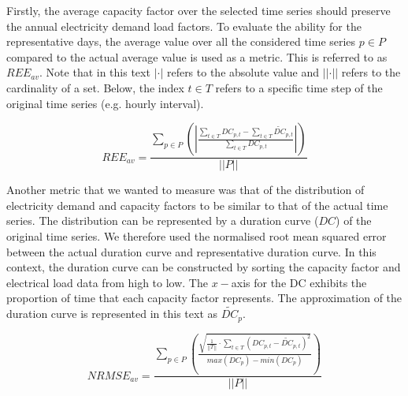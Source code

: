 \documentclass[final,3p,times,twocolumn,numbers]{elsarticle}
\begin{document}
Firstly, the average capacity factor over the selected time series should preserve the annual electricity demand load factors. To evaluate the ability for the representative days, the average value over all the considered time series $p\in P$ compared to the actual average value is used as a metric. This is referred to as $REE_{av}$. Note that in this text $\left|\cdot\right|$ refers to the absolute value and $\left|\left|\cdot\right|\right|$ refers to the cardinality of a set. Below, the index $t\in T$ refers to a specific time step of the original time series (e.g. hourly interval).

\begin{equation}
	REE_{av}=\frac
	{\sum\limits_{p\in P}\left(\left|
	\frac
	{\sum\limits_{t\in T}DC_{p,t}-\sum\limits_{t\in T}\widetilde{DC}_{p,t}}
	{\sum\limits_{t\in T}DC_{p,t}}
	\right|\right)
	}
	{\left|\left|P\right|\right|}
\end{equation}

Another metric that we wanted to measure was that of the distribution of electricity demand and capacity factors to be similar to that of the actual time series. The distribution can be represented by a duration curve ($DC$) of the original time series. We therefore used the normalised root mean squared error between the actual duration curve and representative duration curve. In this context, the duration curve can be constructed by sorting the capacity factor and electrical load data from high to low. The $x-$axis for the DC exhibits the proportion of time that each capacity factor represents. The approximation of the duration curve is represented in this text as $\widetilde{DC}_p$.



\begin{equation}
	NRMSE_{av}=\frac
	{\sum\limits_{p\in P}\left(\frac
	{\sqrt{
	\frac{1}{\left|\left|T\right|\right|}
	\cdot
	\sum\limits_{t\in T}(DC_{p,t}-\widetilde{DC}_{p,t})^2}
	}
	{max(DC_p)-min(DC_p)}
	\right)}
	{\left|\left|P\right|\right|}
\end{equation}
\end{document}
